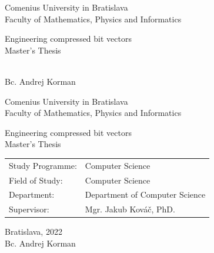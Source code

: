 \documentclass[12pt, twoside]{book}
\def\mfrok{2022}
\def\mfnazov{Engineering compressed bit vectors}
\def\mftyp{Master's Thesis}
\def\mfautor{Bc. Andrej Korman}
\def\mfskolitel{Mgr. Jakub Kováč, PhD.}
\def\mfmiesto{Bratislava, \mfrok}
\def\mfodbor{Computer Science}
\def\program{Computer Science}
\def\mfpracovisko{Department of Computer Science}
\begin{document}
     
\frontmatter


\thispagestyle{empty}

\begin{center}
  \sc\large
  Comenius University in Bratislava\\
  Faculty of Mathematics, Physics and Informatics

\vfill

{\LARGE\mfnazov}\\
\mftyp
\end{center}

\vfill

{\sc\large 
\noindent \mfrok\\
\mfautor
}

\cleardoublepage


\thispagestyle{empty}
\noindent

\begin{center}
\sc  
\large
  Comenius University in Bratislava\\
  Faculty of Mathematics, Physics and Informatics

\vfill

{\LARGE\mfnazov}\\
\mftyp
\end{center}

\vfill

\noindent
\begin{tabular}{ll}
Study Programme: & \program \\
Field of Study: & \mfodbor \\
Department: & \mfpracovisko \\
Supervisor: & \mfskolitel \\
\end{tabular}

\vfill


\noindent \mfmiesto\\
\mfautor

\cleardoublepage


\end{document}
